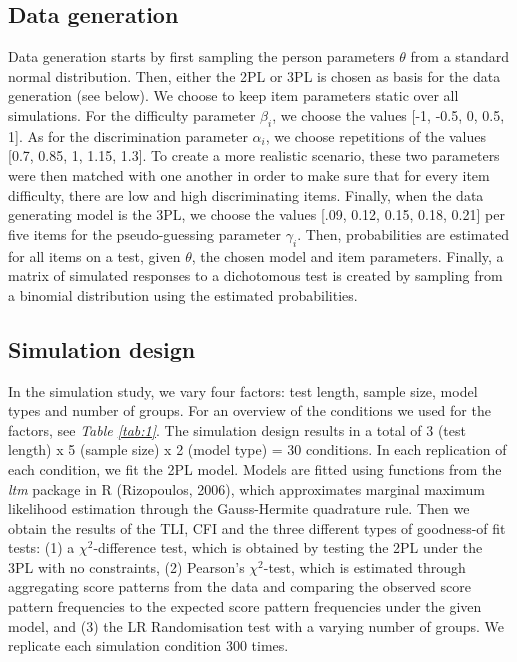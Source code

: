 \documentclass[Royal,sageapa,times,doublespace]{Manuscript-Files/sagej}
\begin{document}
\subsection{Data generation}
Data generation starts by first sampling the person parameters $\theta$ from a standard normal distribution. Then, either the 2PL or 3PL is chosen as basis for the data generation (see below). We choose to keep item parameters static over all simulations. For the difficulty parameter $\beta_i$, we choose the values [-1, -0.5, 0, 0.5, 1]. As for the discrimination parameter $\alpha_i$, we choose repetitions of the values [0.7, 0.85, 1, 1.15, 1.3]. To create a more realistic scenario, these two parameters were then matched with one another in order to make sure that for every item difficulty, there are low and high discriminating items. Finally, when the data generating model is the 3PL, we choose the values [.09, 0.12, 0.15, 0.18, 0.21] per five items for the pseudo-guessing parameter $\gamma_i$. Then, probabilities are estimated for all items on a test, given $\theta$, the chosen model and item parameters. Finally, a matrix of simulated responses to a dichotomous test is created by sampling from a binomial distribution using the estimated probabilities. 
\subsection{Simulation design}
In the simulation study, we vary four factors: test length, sample size, model types and number of groups. For an overview of the conditions we used for the factors, see \textit{Table \ref{tab:1}}. The simulation design results in a total of 3 (test length) x 5 (sample size) x 2 (model type) = 30 conditions. In each replication of each condition, we fit the 2PL model. Models are fitted using functions from the \textit{ltm} package in R (Rizopoulos, 2006), which approximates marginal maximum likelihood estimation through the Gauss-Hermite quadrature rule. Then we obtain the results of the TLI, CFI and the three different types of goodness-of fit tests: (1) a $\chi^2$-difference test, which is obtained by testing the 2PL under the 3PL with no constraints, (2) Pearson's $\chi^2$-test, which is estimated through aggregating score patterns from the data and comparing the observed score pattern frequencies to the expected score pattern frequencies under the given model, and (3) the LR Randomisation test with a varying number of groups. We replicate each simulation condition 300 times.
\end{document}
